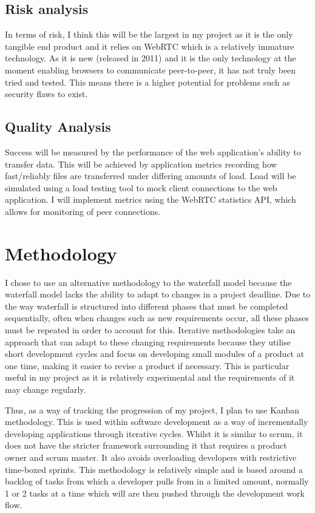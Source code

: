 \documentclass[]{report}
\begin{document}
			\subsection*{Risk analysis}
			In terms of risk, I think this will be the largest in my project as it is the only tangible end product and it relies on WebRTC which is a relatively immature technology. As it is new (released in 2011) and it is the only technology at the moment enabling browsers to communicate peer-to-peer, it has not truly been tried and tested. This means there is a higher potential for problems such as security flaws to exist. 
		
			\subsection*{Quality Analysis}
			Success will be measured by the performance of the web application's ability to transfer data. This will be achieved by application metrics recording how fast/reliably files are transferred under differing amounts of load. Load will be simulated using a load testing tool to mock client connections to the web application. I will implement metrics using the WebRTC statistics API, which allows for monitoring of peer connections.
		
			
			
	\section{Methodology}
		I chose to use an alternative methodology to the waterfall model because the waterfall model lacks the ability to adapt to changes in a project deadline. Due to the way waterfall is structured into different phases that must be completed sequentially, often when changes such as new requirements occur, all these phases must be repeated in order to account for this. Iterative methodologies take an approach that can adapt to these changing requirements because they utilise short development cycles and focus on developing small modules of a product at one time, making it easier to revise a product if necessary. This is particular useful in my project as it is relatively experimental and the requirements of it may change regularly. 
		
		Thus, as a way of tracking the progression of my project, I plan to use Kanban methodology. This is used within software development as a way of incrementally developing applications through iterative cycles. Whilst it is similar to scrum, it does not have the stricter framework surrounding it that requires a product owner and scrum master. It also avoids overloading developers with restrictive time-boxed sprints. This methodology is relatively simple and is based around a backlog of tasks from which a developer pulls from in a limited amount, normally 1 or 2 tasks at a time which will are then pushed through the development work flow.
		
\end{document}
